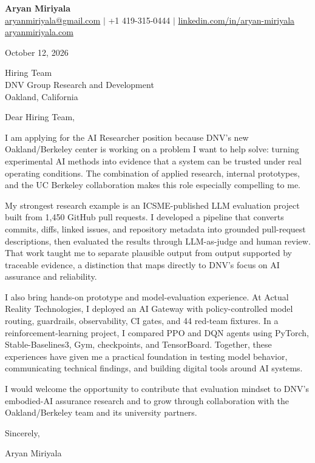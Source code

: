 \documentclass[letterpaper,11pt]{article}
\begin{document}
\begin{center}
{\LARGE\textbf{Aryan Miriyala}}\\[3pt]
\small \href{mailto:aryanmiriyala@gmail.com}{aryanmiriyala@gmail.com} $|$ +1 419-315-0444 $|$
\href{https://www.linkedin.com/in/aryan-miriyala-7788a21b6/}{linkedin.com/in/aryan-miriyala}\\
\href{https://www.aryanmiriyala.com/}{aryanmiriyala.com}
\end{center}

\vspace{8pt}
October 12, 2026

Hiring Team\\
DNV Group Research and Development\\
Oakland, California

Dear Hiring Team,

I am applying for the AI Researcher position because DNV's new Oakland/Berkeley center is working on a problem I want to help solve: turning experimental AI methods into evidence that a system can be trusted under real operating conditions. The combination of applied research, internal prototypes, and the UC Berkeley collaboration makes this role especially compelling to me.

My strongest research example is an ICSME-published LLM evaluation project built from 1,450 GitHub pull requests. I developed a pipeline that converts commits, diffs, linked issues, and repository metadata into grounded pull-request descriptions, then evaluated the results through LLM-as-judge and human review. That work taught me to separate plausible output from output supported by traceable evidence, a distinction that maps directly to DNV's focus on AI assurance and reliability.

I also bring hands-on prototype and model-evaluation experience. At Actual Reality Technologies, I deployed an AI Gateway with policy-controlled model routing, guardrails, observability, CI gates, and 44 red-team fixtures. In a reinforcement-learning project, I compared PPO and DQN agents using PyTorch, Stable-Baselines3, Gym, checkpoints, and TensorBoard. Together, these experiences have given me a practical foundation in testing model behavior, communicating technical findings, and building digital tools around AI systems.

I would welcome the opportunity to contribute that evaluation mindset to DNV's embodied-AI assurance research and to grow through collaboration with the Oakland/Berkeley team and its university partners.

Sincerely,

Aryan Miriyala
\end{document}
